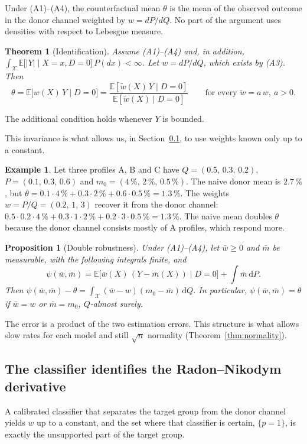 \documentclass[twoside,11pt]{article}
\newcommand{\E}{\mathbb{E}}
\newcommand{\X}{\mathcal{X}}
\newcommand{\dd}{\,\mathrm{d}}
\theoremstyle{plain}
\newtheorem{theorem}{Theorem}
\newtheorem{proposition}{Proposition}
\theoremstyle{definition}
\newtheorem{example}{Example}
\begin{document}
Under (A1)--(A4), the counterfactual mean $\theta$ is the mean of the observed outcome in the donor channel weighted by $w=dP/dQ$. No part of the argument uses densities with respect to Lebesgue measure.

\begin{theorem}[Identification]\label{thm:identification}
Assume (A1)--(A4) and, in addition, $\int_\X\E\bigl[|Y|\mid X=x,D=0\bigr]\,P(dx)<\infty$. Let $w=dP/dQ$, which exists by (A3). Then
\[
\theta=\E\bigl[w(X)\,Y\mid D=0\bigr]=\frac{\E[\tilde w(X)\,Y\mid D=0]}{\E[\tilde w(X)\mid D=0]}\qquad\text{for every }\tilde w=a\,w,\ a>0.
\]
\end{theorem}
The additional condition holds whenever $Y$ is bounded.


This invariance is what allows us, in Section~\ref{sec:classifier}, to use weights known only up to a constant.

\begin{example}\label{ex:toy}
Let three profiles A, B and C have $Q=(0.5,\,0.3,\,0.2)$, $P=(0.1,\,0.3,\,0.6)$ and $m_0=(4\,\%,\,2\,\%,\,0.5\,\%)$. The naive donor mean is $2.7\,\%$, but $\theta=0.1\cdot4\,\%+0.3\cdot2\,\%+0.6\cdot0.5\,\%=1.3\,\%$. The weights $w=P/Q=(0.2,\,1,\,3)$ recover it from the donor channel: $0.5\cdot0.2\cdot4\,\%+0.3\cdot1\cdot2\,\%+0.2\cdot3\cdot0.5\,\%=1.3\,\%$. The naive mean doubles $\theta$ because the donor channel consists mostly of A profiles, which respond more.
\end{example}

\begin{proposition}[Double robustness]\label{prop:dr}
Under (A1)--(A4), let $\bar w\ge0$ and $\bar m$ be measurable, with the following integrals finite, and
\[
\psi(\bar w,\bar m)=\E\bigl[\bar w(X)\,(Y-\bar m(X))\mid D=0\bigr]+\int\bar m\dd P .
\]
Then $\psi(\bar w,\bar m)-\theta=\int_\X(\bar w-w)(m_0-\bar m)\dd Q$. In particular, $\psi(\bar w,\bar m)=\theta$ if $\bar w=w$ or $\bar m=m_0$, $Q$-almost surely.
\end{proposition}

The error is a product of the two estimation errors. This structure is what allows slow rates for each model and still $\sqrt n$ normality (Theorem~\ref{thm:normality}).
\subsection{The classifier identifies the Radon--Nikodym derivative}\label{sec:classifier}

A calibrated classifier that separates the target group from the donor channel yields $w$ up to a constant, and the set where that classifier is certain, $\{p=1\}$, is exactly the unsupported part of the target group.
\end{document}
